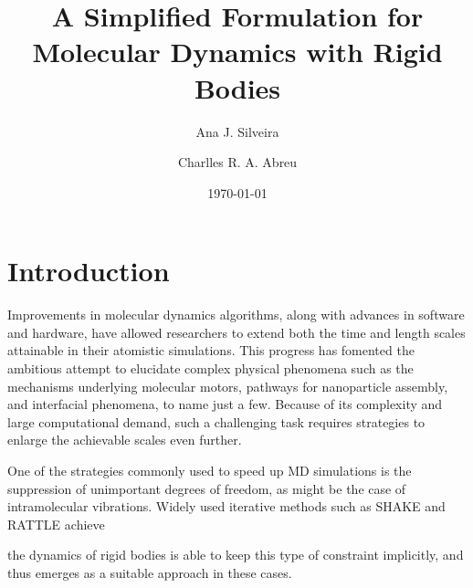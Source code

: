 \documentclass[aip,jcp,reprint,amsmath,amssymb]{revtex4-1}
\begin{document}
\title{A Simplified Formulation for Molecular Dynamics with Rigid Bodies}

\author{Ana J. Silveira}

\author{Charlles R. A. Abreu}

\date{\today}

\maketitle

\section{Introduction}

Improvements in molecular dynamics algorithms, along with advances in software and hardware, have allowed researchers to extend both the time and length scales attainable in their atomistic simulations. This progress has fomented the ambitious attempt to elucidate complex physical phenomena such as the mechanisms underlying molecular motors, pathways for nanoparticle assembly, and interfacial phenomena, to name just a few. Because of its complexity and large computational demand, such a challenging task requires strategies to enlarge the achievable scales even further.

One of the strategies commonly used to speed up MD simulations is the suppression of unimportant degrees of freedom, as might be the case of intramolecular vibrations. Widely used iterative methods such as SHAKE\cite{Ryckaert1977} and RATTLE\cite{Andersen1983} achieve 

the dynamics of rigid bodies is able to keep this type of constraint implicitly, and thus emerges as a suitable approach in these cases.
\end{document}
